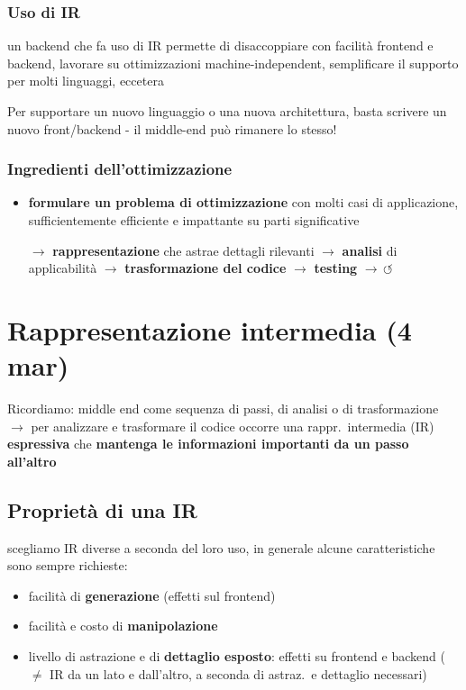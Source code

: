 \subsubsection{Uso di IR}

un backend che fa uso di IR permette di disaccoppiare con facilit\`a frontend e backend, lavorare su ottimizzazioni machine-independent, semplificare il supporto per molti linguaggi, eccetera

\begin{emphasize}
  Per supportare un nuovo linguaggio o una nuova architettura, basta scrivere un nuovo front/backend - il middle-end pu\`o rimanere lo stesso!
\end{emphasize}

\subsubsection{Ingredienti dell'ottimizzazione}

\begin{itemize}
  \item \textbf{formulare un problema di ottimizzazione} con molti casi di applicazione, sufficientemente efficiente e impattante su parti significative
  \item[$\rightarrow$] \textbf{rappresentazione} che astrae dettagli rilevanti $\rightarrow$ \textbf{analisi} di applicabilit\`a $\rightarrow$ \textbf{trasformazione del codice} $\rightarrow$ \textbf{testing} $\rightarrow \, \circlearrowleft$
\end{itemize}

\vspace{-2em}
\section{Rappresentazione intermedia (4 mar)}

Ricordiamo: middle end come sequenza di passi, di analisi o di trasformazione $\rightarrow$ per analizzare e trasformare il codice occorre una rappr.~intermedia (IR) \textbf{espressiva} che \textbf{mantenga le informazioni importanti da un passo all'altro}

\vspace{-1em}
\subsection{Propriet\`a di una IR}

scegliamo IR diverse a seconda del loro uso, in generale alcune caratteristiche sono sempre richieste:
\begin{itemize}
  \item facilit\`a di \textbf{generazione} (effetti sul frontend)
  \item facilit\`a e costo di \textbf{manipolazione}
  \item livello di astrazione e di \textbf{dettaglio esposto}: effetti su frontend e backend ($\neq$ IR da un lato e dall'altro, a seconda di astraz.~e dettaglio necessari)
\end{itemize}

